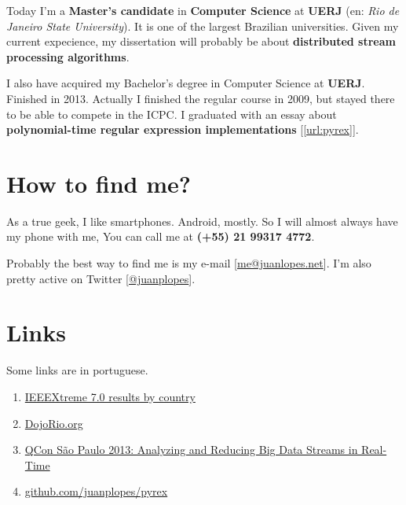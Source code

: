 \documentclass[a4paper,12pt,oneside]{article}
\begin{document}
	Today I'm a \textbf{Master's candidate} in \textbf{Computer Science} at \textbf{UERJ} (en: \emph{Rio de Janeiro State University}). It is one of the largest Brazilian universities. Given my current expecience, my dissertation will probably be about \textbf{distributed stream processing algorithms}.

	I also have acquired my Bachelor's degree in Computer Science at \textbf{UERJ}. Finished in 2013. Actually I finished the regular course in 2009, but stayed there to be able to compete in the ICPC. I graduated with an essay about \textbf{polynomial-time regular expression implementations} [\ref{url:pyrex}].

\section*{How to find me?}

	As a true geek, I like smartphones. Android, mostly. So I will almost always have my phone with me, You can call me at \textbf{(+55) 21 99317 4772}.
	
	Probably the best way to find me is my e-mail [\href{mailto:me@juanlopes.net}{me@juanlopes.net}]. I'm also pretty active on Twitter [\href{http://twitter.com/juanplopes}{@juanplopes}].

\section*{Links}

	Some links are in portuguese.

\begin{enumerate}

  \item \label{url:ieeextreme} \href{http://www.ieee.org/membership_services/membership/students/competitions/xtreme/xtreme7_final_rankings-country.pdf}{IEEEXtreme 7.0 results by country}
  \item \label{url:dojorio} \href{http://dojorio.org/}{DojoRio.org}
  \item \label{url:qconsp2013} \href{http://www.infoq.com/br/presentations/analisando-fluxo-dados-tempo-real}{QCon São Paulo 2013: Analyzing and Reducing Big Data Streams in Real-Time}
  \item \label{url:pyrex} \href{http://github.com/juanplopes/pyrex}{github.com/juanplopes/pyrex}
\end{enumerate}
\end{document}
